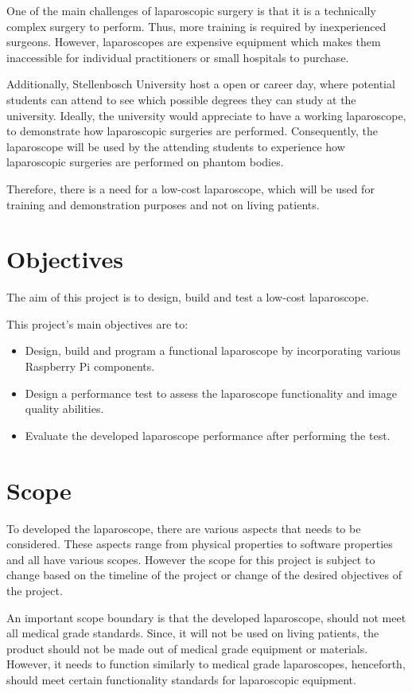 One of the main challenges of laparoscopic surgery is that it is a technically complex surgery to perform. Thus, more training is required by inexperienced surgeons. However, laparoscopes are expensive equipment which makes them inaccessible for individual practitioners or small hospitals to purchase. \citep{JSE-2014} 

Additionally, Stellenbosch University host a open or career day, where potential students can attend to see which possible degrees they can study at the university. Ideally, the university would appreciate to have a working laparoscope, to demonstrate how laparoscopic surgeries are performed. Consequently, the laparoscope will be used by the attending students to experience how laparoscopic surgeries are performed on phantom bodies.


Therefore, there is a need for a low-cost laparoscope, which will be used for training and demonstration purposes and not on living patients.


\section{Objectives}

The aim of this project is to design, build and test a low-cost laparoscope.

This project's main objectives are to:
\begin{itemize}
    \item Design, build and program a functional laparoscope by incorporating various Raspberry Pi components.
    \item Design a performance test to assess the laparoscope functionality and image quality abilities.
    \item Evaluate the developed laparoscope performance after performing the test.
\end{itemize}

\section{Scope}
\label{sec:Scope}

To developed the laparoscope, there are various aspects that needs to be considered. These aspects range from physical properties to software properties and all have various scopes. However the scope for this project is subject to change based on the timeline of the project or change of the desired objectives of the project.

An important scope boundary is that the developed laparoscope, should not meet all medical grade standards. Since, it will not be used on living patients, the product should not be made out of medical grade equipment or materials. However, it needs to function similarly to medical grade laparoscopes, henceforth, should meet certain functionality standards for laparoscopic equipment.

